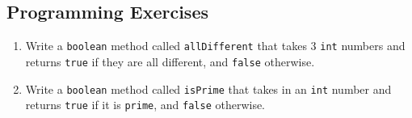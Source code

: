 \subsection{Programming Exercises}

\begin{enumerate}

\item Write a \verb|boolean| method called \verb|allDifferent| that takes 3 \verb|int| numbers and returns \verb|true| if they are all different, and \verb|false| otherwise.

\item Write a \verb|boolean| method called \verb|isPrime| that takes in an \verb|int| number and returns \verb|true| if it is \verb|prime|, and \verb|false| otherwise.

\end{enumerate}
